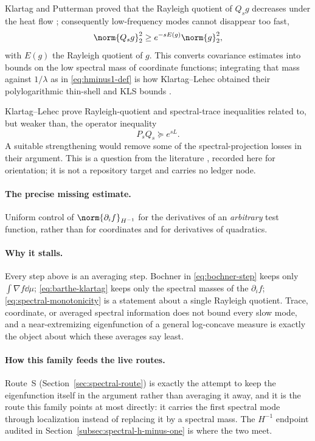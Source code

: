 \documentclass[../../main.tex]{subfiles}
\begin{document}
Klartag and Putterman proved that the Rayleigh quotient of $Q_sg$ decreases under the heat flow
\cite{KlartagPutterman2021SpectralMonotonicity}; consequently low-frequency modes cannot disappear
too fast,
\begin{equation}
  \norm{Q_sg}_2^2\ge e^{-sE(g)}\norm{g}_2^2 ,
  \label{eq:spectral-monotonicity}
\end{equation}
with $E(g)$ the Rayleigh quotient of $g$. This converts covariance estimates into bounds on the
low spectral mass of coordinate functions; integrating that mass against $1/\lambda$ as in
\eqref{eq:hminus1-def} is how Klartag--Lehec obtained their polylogarithmic thin-shell and KLS
bounds \cite{KlartagLehec2022Polylog}.

\begin{remark}
\label{q:literature-PsQs}
Klartag--Lehec prove Rayleigh-quotient and spectral-trace inequalities related to, but weaker than,
the operator inequality
\[
  P_sQ_s\succeq e^{sL} .
\]
A suitable strengthening would remove some of the spectral-projection losses in their argument.
This is a question from the literature \cite{KlartagLehec2022Polylog}, recorded here for
orientation; it is not a repository target and carries no ledger node.
\end{remark}

\paragraph{The precise missing estimate.}
Uniform control of $\norm{\partial_if}_{H^{-1}}$ for the derivatives of an \emph{arbitrary} test
function, rather than for coordinates and for derivatives of quadratics.

\paragraph{Why it stalls.}
Every step above is an averaging step. Bochner in
\eqref{eq:bochner-step} keeps only $\int\nabla f\dd\mu$; \eqref{eq:barthe-klartag} keeps only the
spectral masses of the $\partial_if$; \eqref{eq:spectral-monotonicity} is a statement about a
single Rayleigh quotient. Trace, coordinate, or averaged spectral information does not bound every
slow mode, and a near-extremizing eigenfunction of a general log-concave measure is exactly the
object about which these averages say least.

\paragraph{How this family feeds the live routes.}
Route~S (Section~\ref{sec:spectral-route}) is exactly the attempt to keep the eigenfunction
itself in the argument rather than averaging it away, and it is the route this family points at
most directly: it carries the first spectral mode through localization instead of replacing it by
a spectral mass. The $H^{-1}$ endpoint audited in Section~\ref{subsec:spectral-h-minus-one} is
where the two meet.
\end{document}

